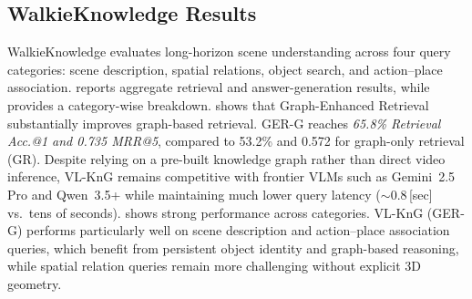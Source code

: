\subsection{WalkieKnowledge Results}
WalkieKnowledge evaluates long-horizon scene understanding across four query categories: scene description, spatial relations, object search, and action–place association.
 reports aggregate retrieval and answer-generation results, while  provides a category-wise breakdown.
 shows that Graph-Enhanced Retrieval substantially improves graph-based retrieval. GER-G reaches \textit{65.8\% Retrieval Acc.@1 and 0.735 MRR@5}, compared to 53.2\% and 0.572 for graph-only retrieval (GR). Despite relying on a pre-built knowledge graph rather than direct video inference, VL-KnG remains competitive with frontier VLMs such as Gemini~2.5 Pro and Qwen~3.5+ while maintaining much lower query latency ($\sim0.8$\,[sec] vs.\ tens of seconds).
 shows strong performance across categories. VL-KnG (GER-G) performs particularly well on scene description and action–place association queries, which benefit from persistent object identity and graph-based reasoning, while spatial relation queries remain more challenging without explicit 3D geometry.



